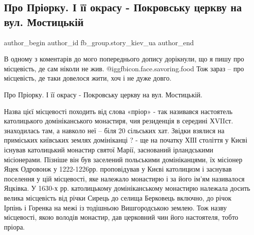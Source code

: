  
 
 
 
 
 
\subsection{Про Пріорку. І її окрасу - Покровську церкву на вул. Мостицькій}
\label{sec:05_12_2021.fb.fb_group.story_kiev_ua.1.priorka}
 
\ifcmt
 author_begin
   author_id fb_group.story_kiev_ua
 author_end
\fi

В одному з коментарів до мого попереднього допису дорікнули, що я пишу про
місцевість, де сам ніколи не жив.  @igg{fbicon.face.savoring.food}  Тож зараз – про місцевість, де таки
довелося жити, хоч і не дуже довго.

Про Пріорку. І її окрасу - Покровську церкву на вул. Мостицькій.  

\begin{multicols}{2}
\end{multicols}

Назва цієї місцевості походить від слова «пріор» - так називався настоятель
католицького домініканського монастиря, чия резиденція в середині ХVIIст.
знаходилась там, а навколо неї – біля 20 сільських хат. Звідки взялися на
приміських київських землях домініканці ? - ще на початку ХІІІ століття у Києві
існував католицький монастир святої Марії, заснований ірландськими місіонерами.
Пізніше він був заселений польськими домініканцями, їх місіонер Яцек Одровонж у
1222-1226рр. проповідував у Києві католицизм і заснував поселення у цій
місцевості, яке належало монастирю і за його ім’ям називалося Яцківка. У 1630-х
рр. католицькому домініканському монастирю належала досить велика місцевість
від річки Сирець до селища Берковець включно, до річок Ірпінь і Горенка на межі
із тодішньою Вишгородською землею. Тож назву місцевості, якою володів монастир,
дав церковний чин його настоятеля, тобто пріора.

